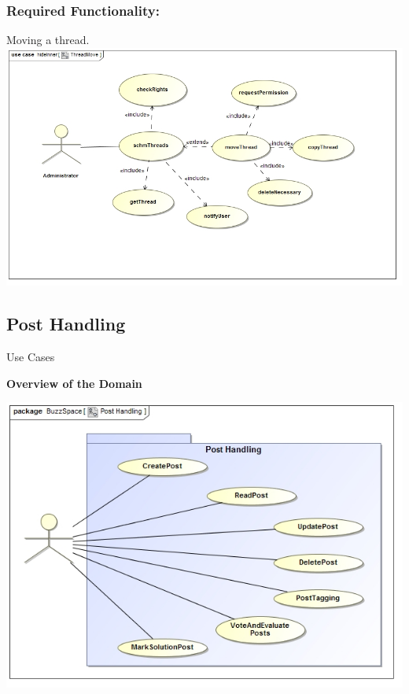 \documentclass[a4paper,11pt]{article}
\begin{document}
\subsubsection{Required Functionality:} 
Moving a thread.\\
\includegraphics[width=0.7\linewidth]{./Images/SCHMThread/ThreadMove.jpg}\\

\newpage
\begin{center}
\section{\textbf{\huge{Post Handling}}}
\Large{Use Cases}
\end{center}

\textbf{Overview of the Domain}
\begin{center}
\includegraphics[width=1\linewidth]{./Images/PostHandling/Overview.jpg}\\
\end{center}
\end{document}

